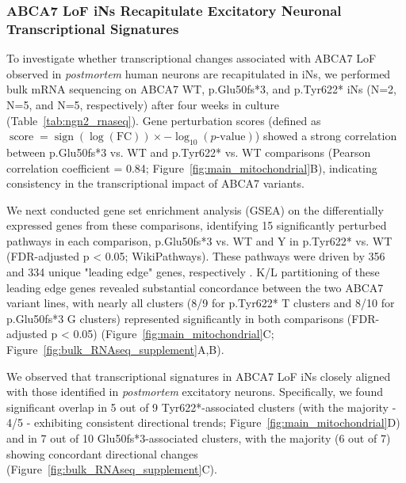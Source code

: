 \subsubsection{ABCA7 LoF iNs Recapitulate Excitatory Neuronal Transcriptional Signatures}
To investigate whether transcriptional changes associated with ABCA7 LoF observed in \emph{postmortem} human neurons are recapitulated in iNs, we performed bulk mRNA sequencing on ABCA7 WT, p.Glu50fs*3, and p.Tyr622* iNs (N=2, N=5, and N=5, respectively) after four weeks in culture (Table~\ref{tab:ngn2_rnaseq}). Gene perturbation scores (defined as $\operatorname{score} = \operatorname{sign}(\log(\text{FC})) \times -\log_{10}(p\text{-value})$) showed a strong correlation between p.Glu50fs*3 vs. WT and p.Tyr622* vs. WT comparisons (Pearson correlation coefficient = 0.84; Figure~\ref{fig:main_mitochondrial}B), indicating consistency in the transcriptional impact of ABCA7 variants.

We next conducted gene set enrichment analysis (GSEA) on the differentially expressed genes from these comparisons, identifying 15 significantly perturbed pathways in each comparison, p.Glu50fs*3 vs. WT and Y in p.Tyr622* vs. WT (FDR-adjusted p < 0.05; WikiPathways). These pathways were driven by 356 and 334 unique "leading edge" genes, respectively \cite{Subramanian2005-pu}. K/L partitioning of these leading edge genes revealed substantial concordance between the two ABCA7 variant lines, with nearly all clusters (8/9 for p.Tyr622* T clusters and 8/10 for p.Glu50fs*3 G clusters) represented significantly in both comparisons (FDR-adjusted p < 0.05) (Figure~\ref{fig:main_mitochondrial}C; Figure~\ref{fig:bulk_RNAseq_supplement}A,B).

We observed that transcriptional signatures in ABCA7 LoF iNs closely aligned with those identified in \textit{postmortem} excitatory neurons. Specifically, we found significant overlap in 5 out of 9 Tyr622*-associated clusters (with the majority - 4/5 - exhibiting consistent directional trends; Figure~\ref{fig:main_mitochondrial}D) and in 7 out of 10 Glu50fs*3-associated clusters, with the majority (6 out of 7) showing concordant directional changes (Figure~\ref{fig:bulk_RNAseq_supplement}C).

